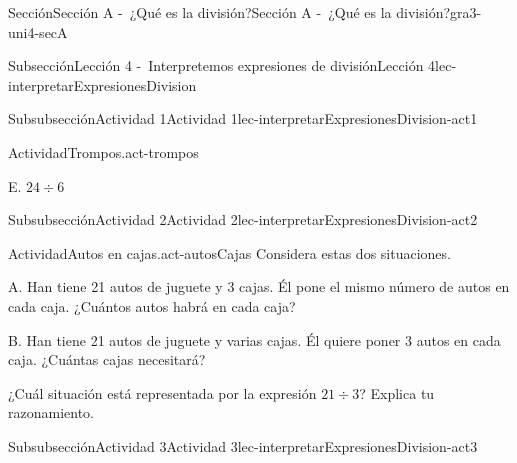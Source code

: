 \documentclass[twoside,10pt,]{article}
\begin{document}
\begin{sectionptx}{Sección}{Sección A -~¿Qué es la división?}{}{Sección A -~¿Qué es la división?}{}{}{gra3-uni4-secA}
\begin{subsectionptx}{Subsección}{Lección 4 -~Interpretemos expresiones de división}{}{Lección 4}{}{}{lec-interpretarExpresionesDivision}
\begin{subsubsectionptx}{Subsubsección}{Actividad 1}{}{Actividad 1}{}{}{lec-interpretarExpresionesDivision-act1}
\begin{activity}{Actividad}{Trompos.}{act-trompos}
\begin{sidebyside}{2}{0.05}{0}{0.15}
\begin{sbspanel}{0.2}%
\par
E. \(24 \div 6\)%
\end{sbspanel}%
\end{sidebyside}%
\end{activity}%
%
%
%
%
%
\end{subsubsectionptx}
%
%
\typeout{************************************************}
\typeout{************************************************}
%
\begin{subsubsectionptx}{Subsubsección}{Actividad 2}{}{Actividad 2}{}{}{lec-interpretarExpresionesDivision-act2}
\begin{activity}{Actividad}{Autos en cajas.}{act-autosCajas}%
Considera estas dos situaciones.%
\begin{sidebyside}{2}{0.05}{0.05}{0.1}%
\begin{sbspanel}{0.4}%
A. Han tiene 21 autos de juguete y 3 cajas. Él pone el mismo número de autos en cada caja. ¿Cuántos autos habrá en cada caja?%
\end{sbspanel}%
\begin{sbspanel}{0.4}%
\par
B. Han tiene 21 autos de juguete y varias cajas. Él quiere poner 3 autos en cada caja. ¿Cuántas cajas necesitará?%
\end{sbspanel}%
\end{sidebyside}%
\par
¿Cuál situación está representada por la expresión \(21\div 3\)? Explica tu razonamiento.%
\end{activity}%
\end{subsubsectionptx}
%
%
\typeout{************************************************}
\typeout{************************************************}
%
\begin{subsubsectionptx}{Subsubsección}{Actividad 3}{}{Actividad 3}{}{}{lec-interpretarExpresionesDivision-act3}

\end{subsubsectionptx}
\end{subsectionptx}
\end{sectionptx}
\end{document}
